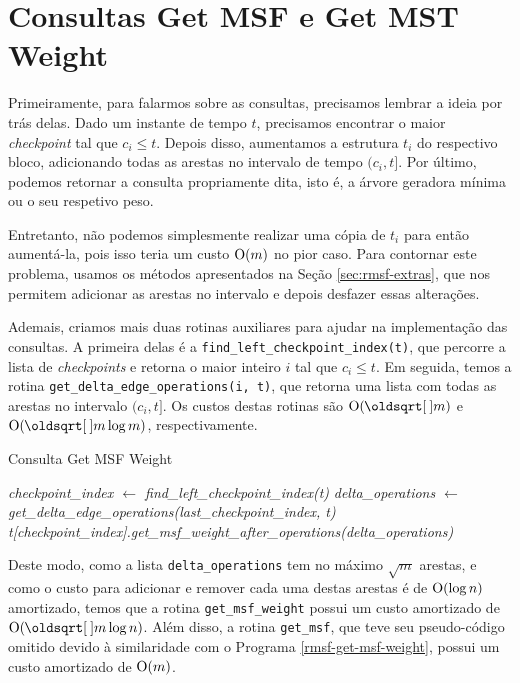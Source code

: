 \section{Consultas Get MSF e Get MST Weight}
\label{sec:rmsf-get-msf}

Primeiramente, para falarmos sobre as consultas, precisamos lembrar a ideia por trás delas. Dado um instante de tempo $t$, precisamos encontrar o maior \emph{checkpoint} tal que $c_i \leq t$. Depois disso, aumentamos a estrutura $t_i$ do respectivo bloco, adicionando todas as arestas no intervalo de tempo $(c_i, t]$. Por último, podemos retornar a consulta propriamente dita, isto é, a árvore geradora mínima ou o seu respetivo peso.

Entretanto, não podemos simplesmente realizar uma cópia de $t_i$ para então aumentá-la, pois isso teria um custo $\mathrm{O}(m)$ no pior caso. Para contornar este problema, usamos os métodos apresentados na Seção \ref{sec:rmsf-extras}, que nos permitem adicionar as arestas no intervalo e depois desfazer essas alterações.

Ademais, criamos mais duas rotinas auxiliares para ajudar na implementação das consultas. A primeira delas é a \texttt{find\_left\_checkpoint\_index(t)}, que percorre a lista de \emph{checkpoints} e retorna o maior inteiro $i$ tal que $c_i \leq t$. Em seguida, temos a rotina \texttt{get\_delta\_edge\_operations(i, t)}, que retorna uma lista com todas as arestas no intervalo $(c_i, t]$. Os custos destas rotinas são $\Oh(\sqrt{m})$ e $\Oh(\sqrt{m}\log{m})$, respectivamente.

\begin{algorithm}[h!]
    \caption{Consulta Get MSF Weight}\label{rmsf-get-msf-weight}
    \begin{algorithmic}[1]
        \State \emph{checkpoint\_index $\gets$ find\_left\_checkpoint\_index(t)}
        \State \emph{delta\_operations $\gets$ get\_delta\_edge\_operations(last\_checkpoint\_index, t)}
        \State \Return \emph{t[checkpoint\_index].get\_msf\_weight\_after\_operations(delta\_operations)}
        \EndFunction
    \end{algorithmic}
\end{algorithm}

Deste modo, como a lista \texttt{delta\_operations} tem no máximo $\sqrt{m}$ arestas, e como o custo para adicionar e remover cada uma destas arestas é de $\mathrm{O}(\log{n})$ amortizado, temos que a rotina \texttt{get\_msf\_weight} possui um custo amortizado de $\Oh(\sqrt{m} \log{n})$. Além disso, a rotina \texttt{get\_msf}, que teve seu pseudo-código omitido devido à similaridade com o Programa \ref{rmsf-get-msf-weight}, possui um custo amortizado de $\mathrm{O}(m)$.

